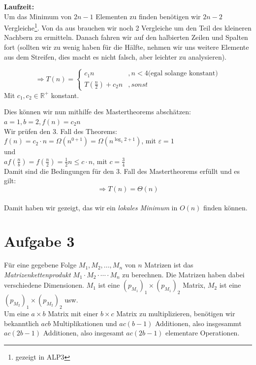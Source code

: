 \documentclass[11pt,a4paper,ngerman]{article}
\begin{document}
\begin{enumerate}[\bfseries (a)]
\textbf{Laufzeit:}\\
Um das Minimum von $2n-1$ Elementen zu finden benötigen wir $2n-2$ Vergleiche\footnote{gezeigt in ALP3}. Von da aus brauchen wir noch 2 Vergleiche um den Teil des kleineren Nachbern zu ermitteln. Danach fahren wir auf den halbierten Zeilen und Spalten fort (sollten wir zu wenig haben für die Hälfte, nehmen wir uns weitere Elemente aus dem Streifen, dies macht es nicht falsch, aber leichter zu analysieren).

$$
\Rightarrow T(n) = \left\{
\begin{array}{lr}
c_1 n &, n < 4 \text{(egal solange konstant)}\\
T(\frac{n}{2}) + c_2 n &, sonst
\end{array}
\right.
$$
Mit $c_1, c_2 \in \mathbb{R}^+$ konstant.
\end{enumerate}

Dies können wir nun mithilfe des Mastertheorems abschätzen:\\
$a=1, b=2, f(n) = c_2 n$\\
Wir prüfen den 3. Fall des Theorems:\\
$f(n) = c_2 \cdot n = \Omega (n^{0 + 1})= \Omega (n^{\log_1 2 + 1})$, mit $\varepsilon = 1$\\
und\\
$a f(\frac{n}{b}) = f(\frac{n}{2}) = \frac{1}{2}n \leq c \cdot n$, mit $c = \frac{3}{4}$\\
Damit sind die Bedingungen für den 3. Fall des Mastertheorems erfüllt und es gilt:
$$
\Rightarrow T(n) = \Theta ( n)  
$$\\

Damit haben wir gezeigt, das wir ein \emph{lokales Minimum} in $O(n)$ finden können.

\section*{Aufgabe 3}

Für eine gegebene Folge $M_1 , M_2, ... , M_n$ von $n$ Matrizen ist das \emph{Matrizenkettenprodukt} $M_1 \cdot M_2 \cdot \cdots \cdot M_n$ zu berechnen. Die Matrizen haben dabei verschiedene Dimensionen. $M_1$ ist eine $\left( p_{M_1} \right)_1 \times \left( p_{M_1} \right)_2$ Matrix, $M_2$ ist eine $\left( p_{M_2} \right)_1 \times \left( p_{M_2} \right)_2$ usw.\\

Um eine $a\times b$ Matrix mit einer $b \times c$ Matrix zu multiplizieren, benötigen wir bekanntlich $acb$ Multiplikationen und $ac\left( b - 1 \right)$ Additionen, also insgesammt $ac \left( 2b - 1\right)$ Additionen, also insgesamt $ac\left( 2b - 1\right)$ elementare Operationen.
\end{document}
